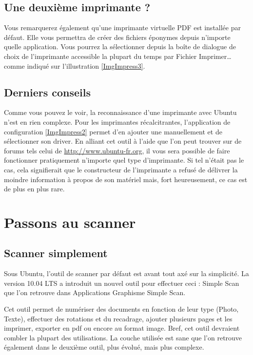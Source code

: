 \subsection{Une deuxième imprimante ?}
Vous remarquerez également qu'une imprimante virtuelle PDF est installée par défaut. Elle vous permettra de créer des fichiers éponymes depuis n’importe quelle application. Vous pourrez la sélectionner depuis la boîte de dialogue de choix de l'imprimante accessible la plupart du temps par Fichier \FlecheDroite Imprimer\dots{} comme indiqué sur l'illustration \ref{ImgImpress3}.\par
{}
\subsection{Derniers conseils}
Comme vous pouvez le voir, la reconnaissance d'une imprimante avec Ubuntu n'est en rien complexe. Pour les imprimantes récalcitrantes, l'application de configuration \ref{ImgImpress2} permet d'en ajouter une manuellement et de sélectionner son driver. En alliant cet outil à l'aide que l'on peut trouver sur de forums tels celui de \url{http://www.ubuntu-fr.org}, il vous sera possible de faire fonctionner pratiquement n'importe quel type d'imprimante. Si tel n'était pas le cas, cela signifierait que le constructeur de l'imprimante a refusé de délivrer la moindre information à propos de son matériel mais, fort heureusement, ce cas est de plus en plus rare.
\section{Passons au scanner}
\subsection{Scanner simplement}
Sous Ubuntu, l'outil de scanner par défaut est avant tout axé sur la simplicité. La version 10.04 LTS a introduit un nouvel outil pour effectuer ceci : Simple Scan que l'on retrouve dans Applications \FlecheDroite Graphisme \FlecheDroite Simple Scan.\par
Cet outil permet de numériser des documents en fonction de leur type (Photo, Texte), effectuer des rotations et du recadrage, ajouter plusieurs pages et les imprimer, exporter en pdf ou encore au format image. Bref, cet outil devraient combler la plupart des utilisations. La couche utilisée est sane que l'on retrouve également dans le deuxième outil, plus évolué, mais plus complexe.
\newpage
